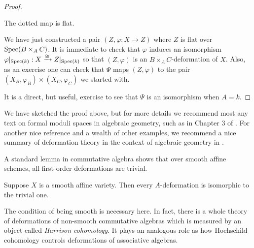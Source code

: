\documentclass[11pt]{amsart}
\def\Spec{{\rm Spec}}
\begin{document}
\begin{proof}
\begin{lem}
The dotted map is flat.
\end{lem}

We have just constructed a pair $(Z, \varphi : X \to Z)$ where $Z$ is flat over $\Spec(B \times_A C)$. 
It is immediate to check that $\varphi$ induces an isomorphism $\varphi |_{\Spec(k)} : X \xto{\cong} Z|_{\Spec(k)}$ so that $(Z, \varphi)$ is an $B \times_A C$-deformation of $X$. 
Also, as an exercise one can check that $\Psi$ maps $(Z, \varphi)$ to the pair $(X_B, \varphi_B) \times (X_C,\varphi_C)$ we started with.

It is a direct, but useful, exercise to see that $\Psi$ is an isomorphism when $A = k$.
\end{proof}

We have sketched the proof above, but for more details we recommend most any text on formal moduli spaces in algebraic geometry, such as in Chapter 3 of \cite{Hartshorne}.
For another nice reference and a wealth of other examples, we recommend a nice summary of deformation theory in the context of algebraic geometry in \cite{Talpo}. 

A standard lemma in commutative algebra shows that over smooth affine schemes, all first-order deformations are trivial. 

\begin{lem}
Suppose $X$ is a smooth affine variety. 
Then every $A$-deformation is isomorphic to the trivial one.
\end{lem}

\begin{rmk}
The condition of being smooth is necessary here. 
In fact, there is a whole theory of deformations of non-smooth commutative algebras which is measured by an object called {\em Harrison cohomology}. 
It plays an analogous role as how Hochschild cohomology controls deformations of associative algebras.
\end{rmk}
\end{document}
